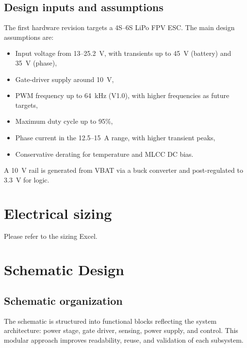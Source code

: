 \documentclass[11pt,a4paper]{article}
\begin{document}
\subsection{Design inputs and assumptions}

The first hardware revision targets a 4S--6S LiPo FPV ESC. The main design assumptions are:
\begin{itemize}[noitemsep, topsep=0pt]
    \item Input voltage from 13--25.2~V, with transients up to 45~V (battery) and 35~V (phase),
    \item Gate-driver supply around 10~V,
    \item PWM frequency up to 64~kHz (V1.0), with higher frequencies as future targets,
    \item Maximum duty cycle up to 95\%,
    \item Phase current in the 12.5--15~A range, with higher transient peaks,
    \item Conservative derating for temperature and MLCC DC bias.
\end{itemize}

A 10~V rail is generated from VBAT via a buck converter and post-regulated to 3.3~V for logic.

\section{Electrical sizing}

Please refer to the sizing Excel.


\section{Schematic Design}
\label{sec:schematic}

\subsection{Schematic organization}

The schematic is structured into functional blocks reflecting the system architecture: power stage, gate driver, sensing, power supply, and control. This modular approach improves readability, reuse, and validation of each subsystem.
\end{document}
